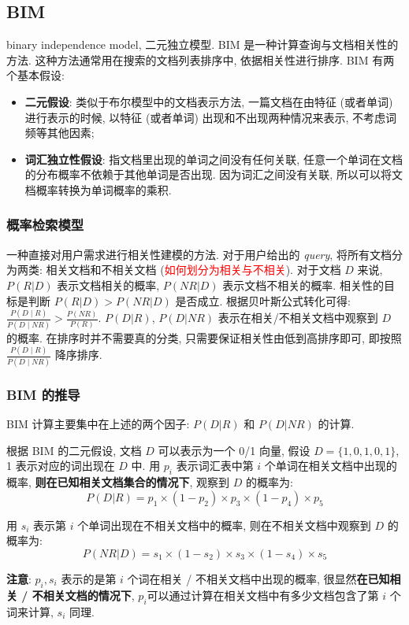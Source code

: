 \subsection{BIM}
binary independence model, 二元独立模型. BIM 是一种计算查询与文档相关性的方法. 这种方法通常用在搜索的文档列表排序中, 依据相关性进行排序. BIM 有两个基本假设: 
\begin{itemize}
	\item \textbf{二元假设}: 类似于布尔模型中的文档表示方法, 一篇文档在由特征 (或者单词) 进行表示的时候, 以特征 (或者单词) 出现和不出现两种情况来表示, 不考虑词频等其他因素;
	
	\item \textbf{词汇独立性假设}: 指文档里出现的单词之间没有任何关联, 任意一个单词在文档的分布概率不依赖于其他单词是否出现. 因为词汇之间没有关联, 所以可以将文档概率转换为单词概率的乘积.
\end{itemize} 

\subsubsection{概率检索模型}
一种直接对用户需求进行相关性建模的方法. 对于用户给出的 \textit{query}, 将所有文档分为两类: 相关文档和不相关文档 (\textcolor{red}{如何划分为相关与不相关}). 对于文档 $D$ 来说, $P(R|D)$ 表示文档相关的概率, $P(NR|D)$ 表示文档不相关的概率. 相关性的目标是判断 $P(R|D) > P(NR|D)$ 是否成立. 根据贝叶斯公式转化可得: $\frac{P(D \mid R)}{P(D \mid N R)}>\frac{P(N R)}{P(R)}$. $P(D|R)$, $P(D|NR)$ 表示在相关/不相关文档中观察到 $D$ 的概率. 在排序时并不需要真的分类, 只需要保证相关性由低到高排序即可, 即按照 $\frac{P(D \mid R)}{P(D \mid N R)}$ 降序排序.

\subsubsection{BIM 的推导}
BIM 计算主要集中在上述的两个因子: $P(D|R)$ 和 $P(D|NR)$ 的计算.

根据 BIM 的二元假设, 文档 $D$ 可以表示为一个 0/1 向量, 假设 $D = \{1, 0, 1, 0, 1\}$, 1 表示对应的词出现在 $D$ 中. 用 $p_i$ 表示词汇表中第 $i$ 个单词在相关文档中出现的概率, \textbf{则在已知相关文档集合的情况下}, 观察到 $D$ 的概率为:
$$
P(D|R) = p_1 \times (1-p_2) \times p_3 \times (1-p_4) \times p_5
$$

用 $s_i$ 表示第 $i$ 个单词出现在不相关文档中的概率, 则在不相关文档中观察到 $D$ 的概率为:
$$
P(NR|D) = s_1 \times (1-s_2) \times s_3 \times (1-s_4) \times s_5
$$

\textbf{注意}: $p_i, s_i$ 表示的是第 $i$ 个词在相关 / 不相关文档中出现的概率, 很显然\textbf{在已知相关 / 不相关文档的情况下}, $p_i$可以通过计算在相关文档中有多少文档包含了第 $i$ 个词来计算, $s_i$ 同理.

